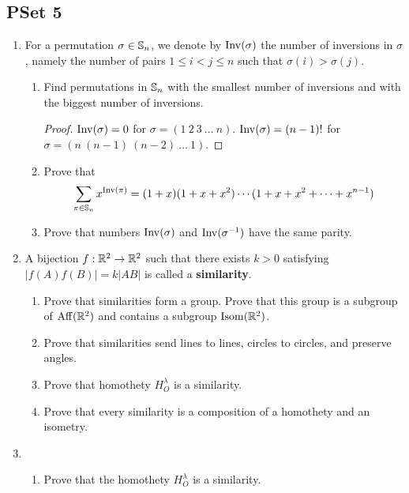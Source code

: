 \documentclass[../main.tex]{subfiles}
\begin{document}
\chapter{}
\section{PSet 5}
\begin{enumerate}
    \item {}For a permutation $\sigma\in\mathbb{S}_n$, we denote by $\operatorname{Inv}(\sigma)$ the number of inversions in $\sigma$, namely the number of pairs $1\leq i<j\leq n$ such that $\sigma(i)>\sigma(j)$.
    \begin{enumerate}
        \item Find permutations in $\mathbb{S}_n$ with the smallest number of inversions and with the biggest number of inversions.
        \begin{proof}
            $\operatorname{Inv}(\sigma)=0$ for $\sigma=(1\ 2\ 3\ \dots\ n)$. $\operatorname{Inv}(\sigma)=(n-1)!$ for $\sigma=(n\ (n-1)\ (n-2)\ \dots\ 1)$.
        \end{proof}
        \item Prove that 
        \begin{equation*}
            \sum_{\pi\in\mathbb{S}_n}x^{\operatorname{Inv}(\pi)} = (1+x)(1+x+x^2)\cdots (1+x+x^2+\cdots+x^{n-1})
        \end{equation*}
        \item Prove that numbers $\operatorname{Inv}(\sigma)$ and $\operatorname{Inv}(\sigma^{-1})$ have the same parity.
    \end{enumerate}
    \item A bijection $f:\mathbb{R}^2\to\mathbb{R}^2$ such that there exists $k>0$ satisfying $|f(A)f(B)|=k|AB|$ is called a \textbf{similarity}.
    \begin{enumerate}
        \item Prove that similarities form a group. Prove that this group is a subgroup of $\operatorname{Aff}(\mathbb{R}^2)$ and contains a subgroup $\operatorname{Isom}(\mathbb{R}^2)$.
        \item Prove that similarities send lines to lines, circles to circles, and preserve angles.
        \item Prove that homothety $H_O^{\lambda}$ is a similarity. 
        \item Prove that every similarity is a composition of a homothety and an isometry.
    \end{enumerate}
    \item 
    \begin{enumerate}
        \item Prove that the homothety $H_O^{\lambda}$ is a similarity. 

\end{enumerate}
\end{enumerate}
\end{document}
